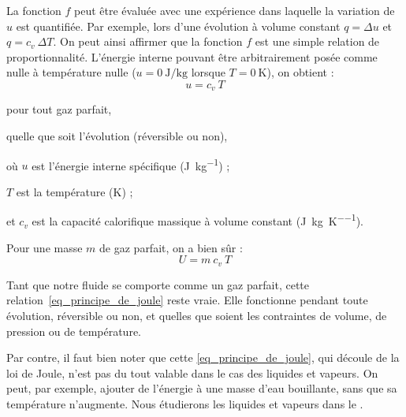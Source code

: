		La fonction $f$ peut être évaluée avec une expérience dans laquelle la variation de~$u$ est quantifiée. Par exemple, lors d’une évolution à volume constant $q = \Delta u$ et $q = c_v \ \Delta T$. On peut ainsi affirmer que la fonction $f$ est une simple relation de proportionnalité. L’énergie interne pouvant être arbitrairement posée comme nulle à température nulle ($u = \SI{0}{\joule\per\kilogram}$ lorsque $T = \SI{0}{\kelvin}$), on obtient :
		\begin{equation}
			u = c_v \ T
			\label{eq_principe_de_joule}
		\end{equation}

		\begin{equationterms}
			\item pour tout gaz parfait,
			\item quelle que soit l’évolution (réversible ou non),
			\item où \tab $u$ 	\tab est l’énergie interne spécifique (\si{\joule\per\kilogram}) ;
			\item 	\tab $T$ 	\tab est la température (\si{\kelvin}) ;
			\item et \tab $c_v$ 	\tab est la capacité calorifique massique à volume constant (\si{\joule\per\kilogram\per\kelvin}).
		\end{equationterms}

		Pour une masse $m$ de gaz parfait, on a bien sûr :
		\begin{equation}
			U = m \ c_v \ T
			\label{eq_principe_de_joule_m}
		\end{equation}

		Tant que notre fluide se comporte comme un gaz parfait, cette relation~\ref{eq_principe_de_joule} reste vraie. Elle fonctionne pendant toute évolution, réversible ou non, et quelles que soient les contraintes de volume, de pression ou de température.

		Par contre, il faut bien noter que cette \cref{eq_principe_de_joule}, qui découle de la loi de Joule, n’est pas du tout valable dans le cas des liquides et vapeurs. On peut, par exemple, ajouter de l’énergie à une masse d’eau bouillante, sans que sa température n’augmente. Nous étudierons les liquides et vapeurs dans le \courscinqshort.
		
